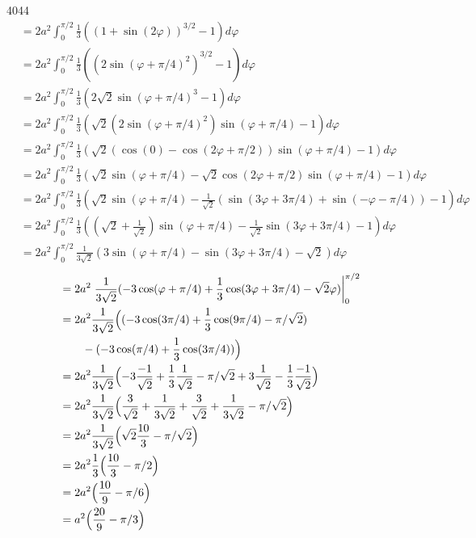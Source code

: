 \documentclass[12pt,a4paper]{article}
\begin{document}
\begin{problem}{4044}
\begin{align*}
            &= 2a^2 \int_0^{\pi/2} \frac{1}{3} ((1 + \sin(2\varphi))^{3/2}-1) d\varphi\\
            &= 2a^2 \int_0^{\pi/2} \frac{1}{3} ((2\sin(\varphi + \pi/4)^2)^{3/2}-1) d\varphi\\
            &= 2a^2 \int_0^{\pi/2} \frac{1}{3} (2\sqrt{2}\sin(\varphi + \pi/4)^3-1) d\varphi\\
            &= 2a^2 \int_0^{\pi/2} \frac{1}{3} (\sqrt{2}(2\sin(\varphi + \pi/4)^2)\sin(\varphi + \pi/4)-1) d\varphi\\
            &= 2a^2 \int_0^{\pi/2} \frac{1}{3} (\sqrt{2}(\cos(0) - \cos(2\varphi + \pi/2))\sin(\varphi + \pi/4)-1) d\varphi\\
            &= 2a^2 \int_0^{\pi/2} \frac{1}{3} (\sqrt{2}\sin(\varphi + \pi/4) - \sqrt{2}\cos(2\varphi + \pi/2)\sin(\varphi + \pi/4)-1) d\varphi\\
            &= 2a^2 \int_0^{\pi/2} \frac{1}{3} (\sqrt{2}\sin(\varphi + \pi/4) - \frac{1}{\sqrt{2}}(\sin(3\varphi + 3\pi/4) + \sin(-\varphi-\pi/4))-1) d\varphi\\
            &= 2a^2 \int_0^{\pi/2} \frac{1}{3} ((\sqrt{2} + \frac{1}{\sqrt{2}})\sin(\varphi + \pi/4) - \frac{1}{\sqrt{2}}\sin(3\varphi + 3\pi/4)-1) d\varphi\\
            &= 2a^2 \int_0^{\pi/2} \frac{1}{3\sqrt{2}} (3\sin(\varphi + \pi/4) - \sin(3\varphi + 3\pi/4)-\sqrt{2}) d\varphi
        \end{align*}
        \begin{align*}
            &= 2a^2 \left.\frac{1}{3\sqrt{2}} (-3\cos(\varphi + \pi/4) + \frac{1}{3}\cos(3\varphi + 3\pi/4)-\sqrt{2}\varphi) \right|_0^{\pi/2} \\
            &= 2a^2 \frac{1}{3\sqrt{2}} \Bigl((-3\cos(3\pi/4) + \frac{1}{3}\cos(9\pi/4)-\pi/\sqrt{2})\Bigr.\\
            &\qquad -\Bigl. (-3\cos(\pi/4) + \frac{1}{3}\cos(3\pi/4))\Bigr)\\
            &= 2a^2 \frac{1}{3\sqrt{2}} \Bigl(-3\frac{-1}{\sqrt{2}} + \frac{1}{3}\frac{1}{\sqrt{2}} - \pi/\sqrt{2} + 3\frac{1}{\sqrt{2}} - \frac{1}{3} \frac{-1}{\sqrt{2}}\Bigr)\\
            &= 2a^2 \frac{1}{3\sqrt{2}} \Bigl(\frac{3}{\sqrt{2}} + \frac{1}{3\sqrt{2}} + \frac{3}{\sqrt{2}} + \frac{1}{3\sqrt{2}} - \pi/\sqrt{2}\Bigr)\\
            &= 2a^2 \frac{1}{3\sqrt{2}} \Bigl(\sqrt{2} \frac{10}{3} - \pi/\sqrt{2}\Bigr)\\
            &= 2a^2 \frac{1}{3} \Bigl(\frac{10}{3} - \pi/2\Bigr)\\
            &= 2a^2 \Bigl(\frac{10}{9} - \pi/6\Bigr)\\
            &= a^2 \Bigl(\frac{20}{9} - \pi/3\Bigr)
        \end{align*}
    \end{problem}
\end{document}
